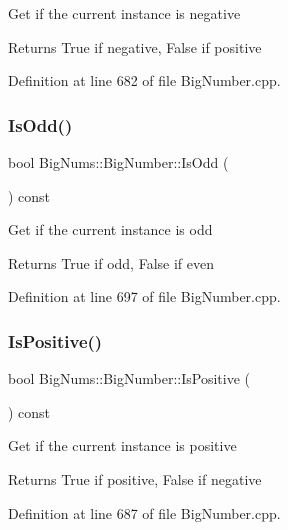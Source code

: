 Get if the current instance is negative \begin{DoxyReturn}{Returns}
True if negative, False if positive 
\end{DoxyReturn}


Definition at line 682 of file Big\+Number.\+cpp.

\mbox{\label{class_big_nums_1_1_big_number_afa4fe9880b4c307cd12ebbdbe94c28d2}} 
\subsubsection{\texorpdfstring{IsOdd()}{IsOdd()}}
{\footnotesize\ttfamily bool Big\+Nums\+::\+Big\+Number\+::\+Is\+Odd (\begin{DoxyParamCaption}{ }\end{DoxyParamCaption}) const}

Get if the current instance is odd \begin{DoxyReturn}{Returns}
True if odd, False if even 
\end{DoxyReturn}


Definition at line 697 of file Big\+Number.\+cpp.

\mbox{\label{class_big_nums_1_1_big_number_a8d1479eed46930fdcd374c85881c2864}} 
\subsubsection{\texorpdfstring{IsPositive()}{IsPositive()}}
{\footnotesize\ttfamily bool Big\+Nums\+::\+Big\+Number\+::\+Is\+Positive (\begin{DoxyParamCaption}{ }\end{DoxyParamCaption}) const}

Get if the current instance is positive \begin{DoxyReturn}{Returns}
True if positive, False if negative 
\end{DoxyReturn}


Definition at line 687 of file Big\+Number.\+cpp.

\mbox{\label{class_big_nums_1_1_big_number_a1d7839794fa1b9dd285e017443d1859a}} 
